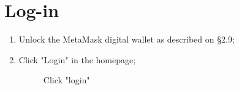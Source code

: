 \documentclass[ManualeUtente]{subfiles}
\begin{document}
\section{Log-in}
\begin{enumerate}
	\item Unlock the MetaMask digital wallet as described on \S 2.9;
	\item Click "Login" in the homepage;
	\begin{figure}[H]
		\centering
		\caption{Click "login"}
		\label{fig:Click "login"}
	\end{figure}
\end{enumerate}
\end{document}
